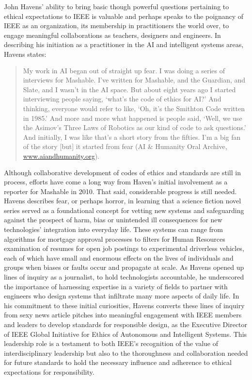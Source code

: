 \documentclass[11pt,dvipdfm]{article}
\begin{document}
John Havens’ ability to bring basic though powerful questions pertaining to ethical expectations to IEEE is valuable and perhaps speaks to the poignancy of IEEE as an organization, its membership in practitioners the world over, to engage meaningful collaborations as teachers, designers and engineers.  In describing his initiation as a practitioner in the AI and intelligent systems areas, Havens states: 
\begin{quote}
	My work in AI began out of straight up fear.  I was doing a series of interviews for Mashable.  I’ve written for Mashable, and the Guardian, and Slate, and I wasn’t in the AI space.  But about eight years ago I started interviewing people saying, ‘what’s the code of ethics for AI?’ And thinking, everyone would refer to like, ‘Oh, it’s the Smithton Code written in 1985.’  And more and more what happened is people said, ‘Well, we use the Asimov’s Three Laws of Robotics as our kind of code to ask questions.’  And initially, I was like that’s a short story from the fifties.  I’m a big fan of the story [but] it started from fear (AI \& Humanity Oral Archive, \url{www.aiandhumanity.org}).
\end{quote}
Although collaborative development of codes of ethics and standards are still in process, efforts have come a long way from Haven’s initial involvement as a reporter for Mashable in 2010.  That said, considerable progress is still needed.  Havens describes fear, or perhaps horror, in learning that a science fiction novel series served as a foundational concept for vetting new systems and safeguarding against the prospect of harm, bias or unintended ill consequences for new technologies’ integration into everyday life.  These systems can range from algorithms for mortgage approval processes to filters for Human Resources examination of resumes for open job postings to experimental driverless vehicles, each of which have small and enormous effects on the lives of individuals and groups when biases or faults occur and propagate at scale.  As Havens opened up lines of inquiry as a journalist, to hold technologists accountable, he underscored the importance of harnessing expertise in a variety of fields to partner with engineers who design systems that infiltrate many more aspects of daily life.  In his commitment to these initial curiosities, Havens converts these lines of inquiry from sexy news article pitches into meaningful engagement with IEEE members and leaders to develop standards for responsible design, as the Executive Director of IEEE Global Initiative for Ethics of Autonomous and Intelligent Systems.  This leadership role is a testament to both IEEE’s recognition of the value of interdisciplinary leadership but also to the thoroughness and collaboration needed for future standards to hold the necessary influence and adherence to ethical expectations for responsibility.  
\end{document}
